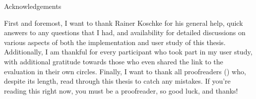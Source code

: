 \documentclass[%
	paper=A4,
	twoside=true,
	openright,
	parskip=half,           %
  11pt,
	chapterprefix=true,     %
	headings=normal,        %
	bibliography=totocnumbered,     %
	titlepage=on,           %
	captions=tableabove,    %
]{scrbook}
\newcommand*\letterfamily{\usefont{U}{RoyalIn}{xl}{n}}
\renewcommand{\ctchapternumber}[1]{%
    \usekomafont{chapter}%
    \begin{minipage}[t]{0.3\textwidth}%
        \raggedleft{%
            {\color{ctcolorchapterline}\rule[-5pt]{2pt}{5cm}}%
            \quad%
            {\color{ctcolorchapternum}\fontsize{60}{60}\selectfont#1}%
        }%
    \end{minipage}}
\begin{document}
{Acknowledgements}

First and foremost, I want to thank Rainer Koschke for his general help, quick answers to any questions that I had, and availability for detailed discussions on various aspects of both the implementation and user study of this thesis.
Additionally, I am thankful for every participant who took part in my user study, with additional gratitude towards those who even shared the link to the evaluation in their own circles.
Finally, I want to thank all {proofreaders} () who, despite its length, read through this thesis to catch any mistakes.
If you're reading this right now, you must be a proofreader, so good luck, and thanks!

\cleardoublepage

{
	\hypersetup{hidelinks}
	\tableofcontents
}
\cleardoublepage

\mainmatter












\cleardoublepage{}

\appendix


\makeatletter
\renewcommand\listoffigures{%
	\chapter{\listfigurename}
	\@starttoc{lof}%
}
\makeatother

\makeatletter
\renewcommand\listoftables{%
	\chapter{\listtablename}
	\@starttoc{lot}%
}
\makeatother
\end{document}
